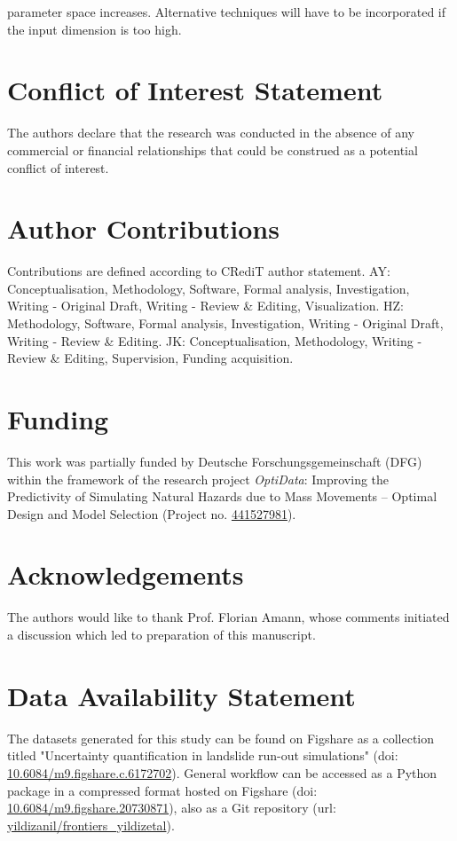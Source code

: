 \documentclass[utf8]{FrontiersinHarvard}
\begin{document}
parameter space increases. Alternative techniques will have to be incorporated if the input dimension is too high.

\section*{Conflict of Interest Statement}
The authors declare that the research was conducted in the absence of any commercial or financial relationships that could be construed as a potential conflict of interest.

\section*{Author Contributions}
Contributions are defined according to CRediT author statement. AY: Conceptualisation, Methodology, Software, Formal analysis, Investigation, Writing - Original Draft, Writing - Review \& Editing, Visualization. HZ: Methodology, Software, Formal analysis, Investigation, Writing - Original Draft, Writing - Review \& Editing. JK: Conceptualisation, Methodology, Writing - Review \& Editing, Supervision, Funding acquisition.


\section*{Funding}
This work was partially funded by Deutsche Forschungsgemeinschaft (DFG) within the framework of the research project \textit{OptiData}: Improving the Predictivity of Simulating Natural Hazards due to Mass Movements – Optimal Design and Model Selection (Project no. \href{https://gepris.dfg.de/gepris/projekt/441527981?language=en}{441527981}).

\section*{Acknowledgements}
The authors would like to thank Prof. Florian Amann, whose comments initiated a discussion which led to preparation of this manuscript.

\section*{Data Availability Statement}
The datasets generated for this study can be found on Figshare as a collection titled "Uncertainty quantification in landslide run-out simulations" (doi: \href{https://doi.org/10.6084/m9.figshare.c.6172702}{10.6084/m9.figshare.c.6172702}). General workflow can be accessed as a Python package in a compressed format hosted on Figshare (doi: \href{https://doi.org/10.6084/m9.figshare.20730871}{10.6084/m9.figshare.20730871}), also as a Git repository (url: \href{https://github.com/yildizanil/frontiers_yildizetal}{yildizanil/frontiers\_yildizetal}).
\end{document}
